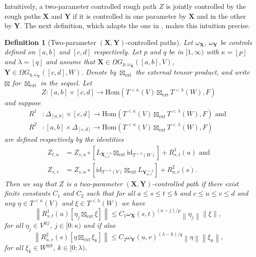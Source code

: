 \documentclass{article}%
\newtheorem{definition}[theorem]{Definition}
\begin{document}
Intuitively, a two-parameter controlled rough path $Z$ is jointly controlled by the rough paths $\mathbf{X}$ and $\mathbf{Y}$ if it is controlled in one parameter by $\mathbf{X}$ and in the other by $\mathbf{Y}$. The next definition, which adapts the one in \cite{cass2023fubini},
makes this intuition precise.
\begin{definition}
[Two-parameter $\left(  \mathbf{X,Y}\right)  $-controlled paths] Let $\omega_\mathbf{X}$, $\omega_\mathbf{Y}$ be controls defined on $[a,b]$ and $[c,d]$ respectively. Let  $p$ and $q$
be in $[1,\infty)$ with $\kappa=\left\lfloor p\right\rfloor $ and
$\lambda=\left\lfloor q\right\rfloor $ and assume that $\mathbf{X} \in \Omega G_{p, \omega_{\mathbf{X}}}([a,b], V)$, $\mathbf{Y} \in \Omega G_{q, \omega_{\mathbf{Y}}}([c,d], W)$. Denote by $\boxtimes_{\mathrm{ext}}$ the external tensor product, and write
$\boxtimes$ for $\boxtimes_{\mathrm{ext}}$ in the sequel.
Let
\[
Z:\left[  a,b\right]  \times\left[  c,d\right]  \rightarrow\mathrm{Hom}\left(
T^{<\kappa}\left(  V\right)  \boxtimes_{\mathrm{ext}} T^{<\lambda}\left(  W\right)
,F\right)
\]
and suppose
\begin{align*}
R^{1}  & :\Delta_{\left[  a,b\right]  }\times\left[  c,d\right]
\rightarrow \mathrm{Hom}\left(  T^{<\kappa}\left(  V\right)  \boxtimes_{\mathrm{ext}}
T^{<\lambda}\left(  W\right)  ,F\right)  \text{ and }\\
R^{2}  & :\left[  a,b\right]  \times\Delta_{\left[  c,d\right]  }%
\rightarrow \mathrm{Hom}\left(  T^{<\kappa}\left(  V\right)  \boxtimes_{\mathrm{ext}}
T^{<\lambda}\left(  W\right)  ,F\right)
\end{align*}
are defined respectively by the identities
\begin{align}
Z_{t,u}  & = Z_{s,u}\circ\left[  L_{\mathbf{X}_{s,t}^{<\kappa}}\boxtimes_{\mathrm{ext}}
\text{id}_{T^{<\lambda}\left(  W\right)  }\right]  +R_{s,t}^{1}\left(
u\right)  \text{ and}\nonumber\\
Z_{s,v}  & =Z_{s,u}\circ\left[  \text{id}_{T^{<\kappa}\left(  V\right)
}\boxtimes_{\mathrm{ext}} L_{\mathbf{Y}_{u,v}^{<\lambda}}\right]  +R_{u,v}^{2}\left(
s\right)  .\label{constraints}%
\end{align}
Then we say that $Z$ is a two-parameter $\left(  \mathbf{X,Y}\right)
$-controlled path if there exist finite constants $C_{1}$ and $C_{2}$ such
that for all $a\leq s\leq t\leq b$ and $c\leq u\leq v\leq d$ and any $\eta\in
T^{<\kappa}\left(  V\right)  $ and $\xi\in T^{<\lambda}\left(  W\right)  $ we
have
\begin{equation}\label{regularity_condition_r1}
\left \| R_{s,t}^{1}\left(  u\right)  \left[  \eta_{j}\boxtimes_{\mathrm{ext}}
\xi \right]  \right \| \leq C_{1}\omega_{\mathbf{X}}\left(
s,t\right)  ^{\left(  \kappa-j\right)  /p}\left \| \eta_{j}%
\right \| \| \xi \|
\text{, }
\end{equation}
for all $\eta_{j}\in V^{\otimes j}$, $j\in\lbrack0:\kappa)$ and if also
\[
\left\| R_{u,v}^{2}\left(  s\right)  \left[  \eta \boxtimes_{\mathrm{ext}}
\xi _{k}\right]  \right\| \leq C_{2}\omega_{\mathbf{Y}}\left(
u,v\right)  ^{\left(  \lambda-k\right)  /q} \left\| \eta \right\| \left\| \xi_{k}\right\|,
\]
for all $\xi_{k}\in W^{\otimes k}$, $k\in\lbrack0:\lambda).$
\end{definition}
\end{document}
